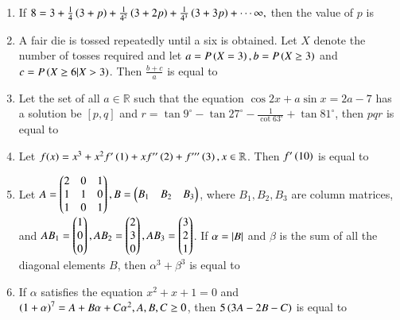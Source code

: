 \documentclass[journal]{IEEEtran}
\begin{document}
\begin{enumerate}[start=16]
\item If $8=3+\frac{1}{4}\left(3+p\right)+\frac{1}{4^2}\left(3+2p\right)+\frac{1}{4^3}\left(3+3p\right)+\cdots\infty,$ then the value of $p$ is \underline{\hspace{1cm}} \\

\item A fair die is tossed repeatedly until a six is obtained. Let $X$ denote the number of tosses required and let $a=P\left(X=3\right), b=P\left(X\geq 3\right)$ and $c=P\left(X\geq 6 |X>3\right)$. Then $\frac{b+c}{a}$ is equal to \underline{\hspace{1cm}}\\

\item Let the set of all $a\in \mathbb R$ such that the equation $\cos 2x+a\sin x=2a-7$ has a solution be ${[p,q]}$ and $r=\tan 9^{\circ}-\tan 27^{\circ}-\frac{1}{\cot 63^{\circ}}+\tan 81^{\circ}$, then $pqr$ is equal to \underline{\hspace{1cm}}\\

\item Let $f(x)=x^3+x^2f'\left(1\right)+xf''\left(2\right)+f'''\left(3\right), x \in \mathbb R$. Then $f'\left(10\right)$ is equal to \underline{\hspace{1cm}}\\

\item Let $A=\begin{pmatrix}2&0&1\\1&1&0\\1&0&1\end{pmatrix}, B=\begin{pmatrix}B_1&B_2&B_3\end{pmatrix}$, where $B_1,B_2,B_3$ are column matrices, and $AB_1=\begin{pmatrix}1\\0\\0\end{pmatrix}, AB_2=\begin{pmatrix}2\\3\\0\end{pmatrix}, AB_3=\begin{pmatrix}3\\2\\1\end{pmatrix}$. If $\alpha=\left\vert B\right\vert$ and $\beta$ is the sum of all the diagonal elements $B$, then $\alpha ^3+\beta ^3$ is equal to  \underline{\hspace{1cm}}\\

\item If $\alpha$ satisfies the equation $x^2+x+1=0$ and $\left(1+\alpha\right)^7=A+B\alpha+C\alpha^{2}, A, B,C \geq 0$, then $5\left(3A-2B-C\right)$ is equal to \underline{\hspace{1cm}}\\
\end{enumerate}
\end{document}
